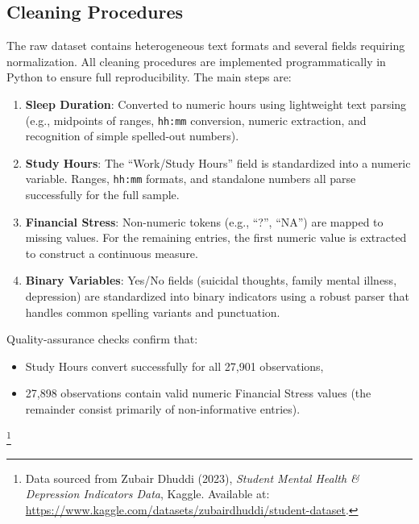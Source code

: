 \documentclass[12pt]{article}
\begin{document}
\subsection{Cleaning Procedures}

The raw dataset contains heterogeneous text formats and several fields requiring 
normalization. All cleaning procedures are implemented programmatically in Python 
to ensure full reproducibility. The main steps are:

\begin{enumerate}
    \item \textbf{Sleep Duration}: Converted to numeric hours using lightweight 
    text parsing (e.g., midpoints of ranges, \texttt{hh:mm} conversion, numeric 
    extraction, and recognition of simple spelled-out numbers).

    \item \textbf{Study Hours}: The ``Work/Study Hours'' field is standardized 
    into a numeric variable. Ranges, \texttt{hh:mm} formats, and standalone 
    numbers all parse successfully for the full sample.

    \item \textbf{Financial Stress}: Non-numeric tokens (e.g., ``?'', ``NA'') are 
    mapped to missing values. For the remaining entries, the first numeric value 
    is extracted to construct a continuous measure.

    \item \textbf{Binary Variables}: Yes/No fields (suicidal thoughts, family 
    mental illness, depression) are standardized into binary indicators using a 
    robust parser that handles common spelling variants and punctuation.
\end{enumerate}

Quality-assurance checks confirm that:
\begin{itemize}
    \item Study Hours convert successfully for all 27{,}901 observations,
    \item 27{,}898 observations contain valid numeric Financial Stress values 
          (the remainder consist primarily of non-informative entries).
\end{itemize}

\footnote{Data sourced from Zubair Dhuddi (2023), \textit{Student Mental
Health \& Depression Indicators Data}, Kaggle. Available at:
\url{https://www.kaggle.com/datasets/zubairdhuddi/student-dataset}.}

\end{document}
